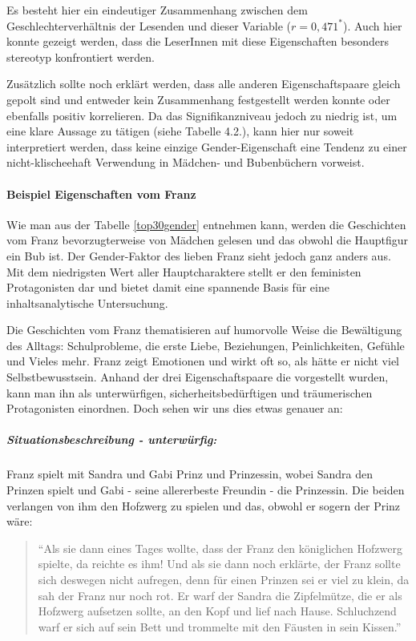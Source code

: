 Es besteht hier ein eindeutiger Zusammenhang zwischen dem
Geschlechterverhältnis der Lesenden und dieser Variable
($r= 0{,}471^*$). Auch hier konnte gezeigt werden, dass die LeserInnen
mit diese Eigenschaften besonders stereotyp konfrontiert werden.

Zusätzlich sollte noch erklärt werden, dass alle anderen
Eigenschaftspaare gleich gepolt sind und entweder kein Zusammenhang
festgestellt werden konnte oder ebenfalls positiv korrelieren. Da das
Signifikanzniveau jedoch zu niedrig ist, um eine klare Aussage zu
tätigen (siehe Tabelle 4.2.), kann hier nur soweit interpretiert werden,
dass keine einzige Gender-Eigenschaft eine Tendenz zu einer
nicht-klischeehaft Verwendung in Mädchen- und Bubenbüchern vorweist.

\paragraph{Beispiel Eigenschaften vom Franz}

Wie man aus der Tabelle \ref{top30gender} entnehmen kann, werden die
Geschichten vom Franz bevorzugterweise von Mädchen gelesen und das
obwohl die Hauptfigur ein Bub ist. Der Gender-Faktor des lieben Franz
sieht jedoch ganz anders aus. Mit dem niedrigsten Wert aller
Hauptcharaktere stellt er den feministen Protagonisten dar und bietet
damit eine spannende Basis für eine inhaltsanalytische Untersuchung.

Die Geschichten vom Franz thematisieren auf humorvolle Weise die
Bewältigung des Alltags: Schulprobleme, die erste Liebe, Beziehungen,
Peinlichkeiten, Gefühle und Vieles mehr. Franz zeigt Emotionen und wirkt
oft so, als hätte er nicht viel Selbstbewusstsein. Anhand der drei
Eigenschaftspaare die vorgestellt wurden, kann man ihn als
unterwürfigen, sicherheitsbedürftigen und träumerischen Protagonisten
einordnen. Doch sehen wir uns dies etwas genauer an:

\subparagraph{Situationsbeschreibung - unterwürfig:}

Franz spielt mit Sandra und Gabi Prinz und Prinzessin, wobei Sandra den
Prinzen spielt und Gabi - seine allererbeste Freundin - die Prinzessin.
Die beiden verlangen von ihm den Hofzwerg zu spielen und das, obwohl er
sogern der Prinz wäre:

\begin{quote}
``Als sie dann eines Tages wollte, dass der Franz den königlichen
Hofzwerg spielte, da reichte es ihm! Und als sie dann noch erklärte, der
Franz sollte sich deswegen nicht aufregen, denn für einen Prinzen sei er
viel zu klein, da sah der Franz nur noch rot. Er warf der Sandra die
Zipfelmütze, die er als Hofzwerg aufsetzen sollte, an den Kopf und lief
nach Hause. Schluchzend warf er sich auf sein Bett und trommelte mit den
Fäusten in sein Kissen.'' \parencite[][30]{Noestlinger2010}
\end{quote}

